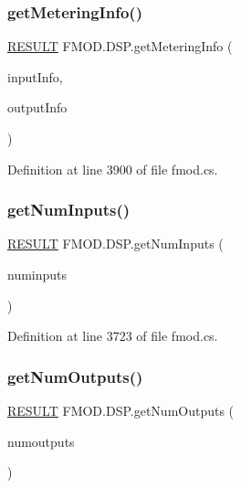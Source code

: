 \subsubsection{\texorpdfstring{get\+Metering\+Info()}{getMeteringInfo()}}
{\footnotesize\ttfamily \hyperlink{namespace_f_m_o_d_a305d1176ef3f8c8815861a60407ac33d}{R\+E\+S\+U\+LT} F\+M\+O\+D.\+D\+S\+P.\+get\+Metering\+Info (\begin{DoxyParamCaption}\item[{\hyperlink{class_f_m_o_d_1_1_d_s_p___m_e_t_e_r_i_n_g___i_n_f_o}{D\+S\+P\+\_\+\+M\+E\+T\+E\+R\+I\+N\+G\+\_\+\+I\+N\+FO}}]{input\+Info,  }\item[{\hyperlink{class_f_m_o_d_1_1_d_s_p___m_e_t_e_r_i_n_g___i_n_f_o}{D\+S\+P\+\_\+\+M\+E\+T\+E\+R\+I\+N\+G\+\_\+\+I\+N\+FO}}]{output\+Info }\end{DoxyParamCaption})}



Definition at line 3900 of file fmod.\+cs.

\mbox{\label{class_f_m_o_d_1_1_d_s_p_af26eb2c452f0ef816a6098395e4f0c6d}} 
\subsubsection{\texorpdfstring{get\+Num\+Inputs()}{getNumInputs()}}
{\footnotesize\ttfamily \hyperlink{namespace_f_m_o_d_a305d1176ef3f8c8815861a60407ac33d}{R\+E\+S\+U\+LT} F\+M\+O\+D.\+D\+S\+P.\+get\+Num\+Inputs (\begin{DoxyParamCaption}\item[{out int}]{numinputs }\end{DoxyParamCaption})}



Definition at line 3723 of file fmod.\+cs.

\mbox{\label{class_f_m_o_d_1_1_d_s_p_a02296a0f4370041e74d427172750bd76}} 
\subsubsection{\texorpdfstring{get\+Num\+Outputs()}{getNumOutputs()}}
{\footnotesize\ttfamily \hyperlink{namespace_f_m_o_d_a305d1176ef3f8c8815861a60407ac33d}{R\+E\+S\+U\+LT} F\+M\+O\+D.\+D\+S\+P.\+get\+Num\+Outputs (\begin{DoxyParamCaption}\item[{out int}]{numoutputs }\end{DoxyParamCaption})}



